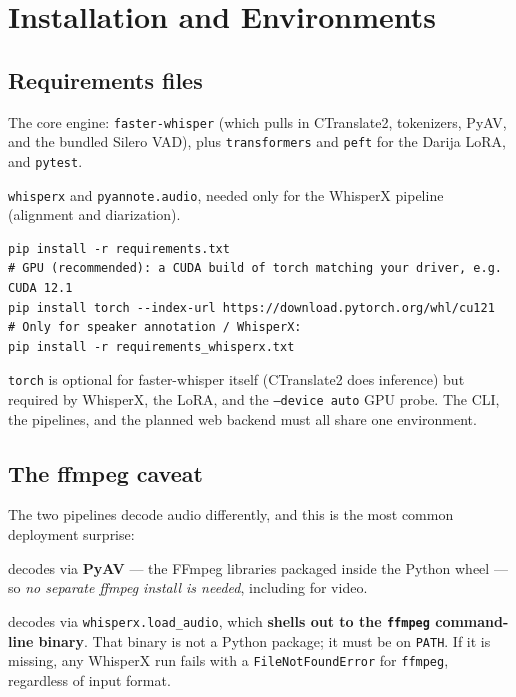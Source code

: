 \documentclass[11pt,a4paper]{report}
\newcommand{\code}[1]{\texttt{\small #1}}
\begin{document}
\chapter{Installation and Environments}
\label{ch:install}

\section{Requirements files}

\begin{description}[leftmargin=2em,style=nextline]
  \item[\texttt{requirements.txt}] The core engine: \code{faster-whisper}
        (which pulls in CTranslate2, tokenizers, PyAV, and the bundled Silero VAD),
        plus \code{transformers} and \code{peft} for the Darija LoRA, and
        \code{pytest}.
  \item[\texttt{requirements\_whisperx.txt}] \code{whisperx} and
        \code{pyannote.audio}, needed only for the WhisperX pipeline (alignment and
        diarization).
\end{description}

\begin{lstlisting}[style=sh,numbers=none,caption={Typical installation.}]
pip install -r requirements.txt
# GPU (recommended): a CUDA build of torch matching your driver, e.g. CUDA 12.1
pip install torch --index-url https://download.pytorch.org/whl/cu121
# Only for speaker annotation / WhisperX:
pip install -r requirements_whisperx.txt
\end{lstlisting}

\code{torch} is optional for faster-whisper itself (CTranslate2 does inference) but
required by WhisperX, the LoRA, and the \code{--device auto} GPU probe. The CLI,
the pipelines, and the planned web backend must all share one environment.

\section{The ffmpeg caveat}

The two pipelines decode audio differently, and this is the most common deployment
surprise:

\begin{description}[leftmargin=2em,style=nextline]
  \item[faster-whisper] decodes via \textbf{PyAV} --- the FFmpeg libraries packaged
        inside the Python wheel --- so \emph{no separate ffmpeg install is needed},
        including for video.
  \item[WhisperX] decodes via \code{whisperx.load\_audio}, which \textbf{shells out
        to the \code{ffmpeg} command-line binary}. That binary is not a Python
        package; it must be on \code{PATH}. If it is missing, any WhisperX run
        fails with a \code{FileNotFoundError} for \code{ffmpeg}, regardless of input
        format.
\end{description}
\end{document}
